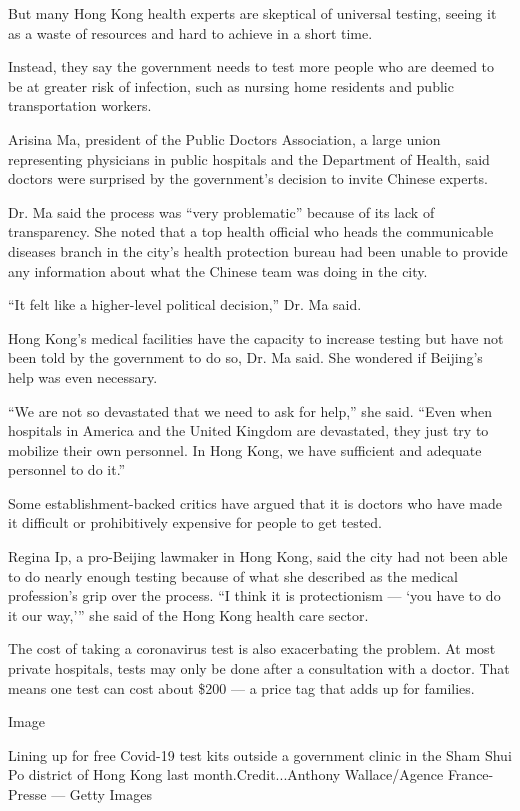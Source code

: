 But many Hong Kong health experts are skeptical of universal testing,
seeing it as a waste of resources and hard to achieve in a short time.

Instead, they say the government needs to test more people who are
deemed to be at greater risk of infection, such as nursing home
residents and public transportation workers.

Arisina Ma, president of the Public Doctors Association, a large union
representing physicians in public hospitals and the Department of
Health, said doctors were surprised by the government's decision to
invite Chinese experts.

Dr. Ma said the process was ``very problematic'' because of its lack of
transparency. She noted that a top health official who heads the
communicable diseases branch in the city's health protection bureau had
been unable to provide any information about what the Chinese team was
doing in the city.

``It felt like a higher-level political decision,'' Dr. Ma said.

Hong Kong's medical facilities have the capacity to increase testing but
have not been told by the government to do so, Dr. Ma said. She wondered
if Beijing's help was even necessary.

``We are not so devastated that we need to ask for help,'' she said.
``Even when hospitals in America and the United Kingdom are devastated,
they just try to mobilize their own personnel. In Hong Kong, we have
sufficient and adequate personnel to do it.''

Some establishment-backed critics have argued that it is doctors who
have made it difficult or prohibitively expensive for people to get
tested.

Regina Ip, a pro-Beijing lawmaker in Hong Kong, said the city had not
been able to do nearly enough testing because of what she described as
the medical profession's grip over the process. ``I think it is
protectionism --- `you have to do it our way,''' she said of the Hong
Kong health care sector.

The cost of taking a coronavirus test is also exacerbating the problem.
At most private hospitals, tests may only be done after a consultation
with a doctor. That means one test can cost about \$200 --- a price tag
that adds up for families.

Image

Lining up for free Covid-19 test kits outside a government clinic in the
Sham Shui Po district of Hong Kong last month.Credit...Anthony
Wallace/Agence France-Presse --- Getty Images

